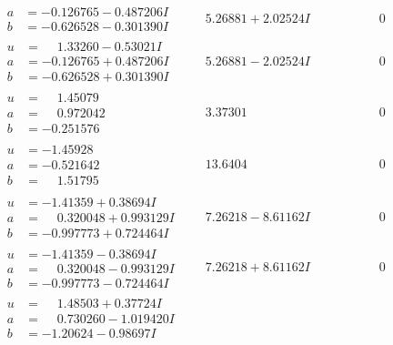 \documentclass[1p]{elsarticle_modified}
\theoremstyle{definition}
\begin{document}
$$\begin{array}{c|c|c}
\begin{aligned}
a &= -0.126765 - 0.487206 I \\
b &= -0.626528 - 0.301390 I\end{aligned}
 & \phantom{-}5.26881 + 2.02524 I & \phantom{-0.000000 } 0 \\ \hline\begin{aligned}
u &= \phantom{-}1.33260 - 0.53021 I \\
a &= -0.126765 + 0.487206 I \\
b &= -0.626528 + 0.301390 I\end{aligned}
 & \phantom{-}5.26881 - 2.02524 I & \phantom{-0.000000 } 0 \\ \hline\begin{aligned}
u &= \phantom{-}1.45079\phantom{ +0.000000I} \\
a &= \phantom{-}0.972042\phantom{ +0.000000I} \\
b &= -0.251576\phantom{ +0.000000I}\end{aligned}
 & \phantom{-}3.37301\phantom{ +0.000000I} & \phantom{-0.000000 } 0 \\ \hline\begin{aligned}
u &= -1.45928\phantom{ +0.000000I} \\
a &= -0.521642\phantom{ +0.000000I} \\
b &= \phantom{-}1.51795\phantom{ +0.000000I}\end{aligned}
 & \phantom{-}13.6404\phantom{ +0.000000I} & \phantom{-0.000000 } 0 \\ \hline\begin{aligned}
u &= -1.41359 + 0.38694 I \\
a &= \phantom{-}0.320048 + 0.993129 I \\
b &= -0.997773 + 0.724464 I\end{aligned}
 & \phantom{-}7.26218 - 8.61162 I & \phantom{-0.000000 } 0 \\ \hline\begin{aligned}
u &= -1.41359 - 0.38694 I \\
a &= \phantom{-}0.320048 - 0.993129 I \\
b &= -0.997773 - 0.724464 I\end{aligned}
 & \phantom{-}7.26218 + 8.61162 I & \phantom{-0.000000 } 0 \\ \hline\begin{aligned}
u &= \phantom{-}1.48503 + 0.37724 I \\
a &= \phantom{-}0.730260 - 1.019420 I \\
b &= -1.20624 - 0.98697 I\end{aligned}

\end{array}$$
\end{document}
